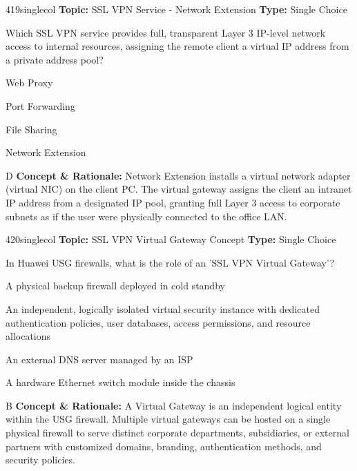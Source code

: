 \begin{qcard}{419}{singlecol}
\textcolor{darkslate!75}{\small\textbf{Topic:} SSL VPN Service - Network Extension \hfill \textbf{Type:} Single Choice}\vspace{0.4em}\par
Which SSL VPN service provides full, transparent Layer 3 IP-level network access to internal resources, assigning the remote client a virtual IP address from a private address pool?
\begin{qoptions}
\item Web Proxy
\item Port Forwarding
\item File Sharing
\item Network Extension
\end{qoptions}
\end{qcard}
\nopagebreak
\begin{explainbox}{D}
\textbf{Concept \& Rationale:} Network Extension installs a virtual network adapter (virtual NIC) on the client PC. The virtual gateway assigns the client an intranet IP address from a designated IP pool, granting full Layer 3 access to corporate subnets as if the user were physically connected to the office LAN.
\end{explainbox}

\begin{qcard}{420}{singlecol}
\textcolor{darkslate!75}{\small\textbf{Topic:} SSL VPN Virtual Gateway Concept \hfill \textbf{Type:} Single Choice}\vspace{0.4em}\par
In Huawei USG firewalls, what is the role of an 'SSL VPN Virtual Gateway'?
\begin{qoptions}
\item A physical backup firewall deployed in cold standby
\item An independent, logically isolated virtual security instance with dedicated authentication policies, user databases, access permissions, and resource allocations
\item An external DNS server managed by an ISP
\item A hardware Ethernet switch module inside the chassis
\end{qoptions}
\end{qcard}
\nopagebreak
\begin{explainbox}{B}
\textbf{Concept \& Rationale:} A Virtual Gateway is an independent logical entity within the USG firewall. Multiple virtual gateways can be hosted on a single physical firewall to serve distinct corporate departments, subsidiaries, or external partners with customized domains, branding, authentication methods, and security policies.
\end{explainbox}
